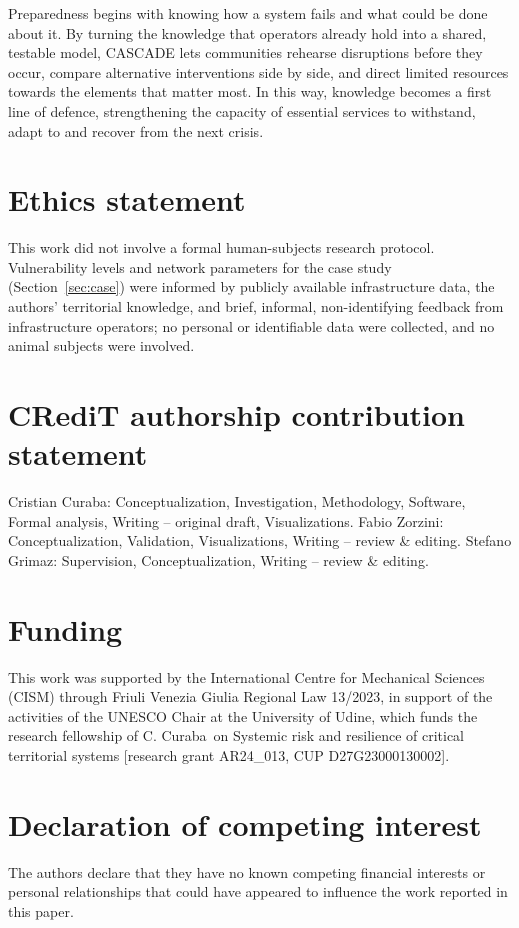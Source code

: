 \documentclass[review,12pt]{elsarticle}
\begin{document}
Preparedness begins with knowing how a system fails and what could be done about it. By turning the knowledge that operators already hold into a shared, testable model, CASCADE lets communities rehearse disruptions before they occur, compare alternative interventions side by side, and direct limited resources towards the elements that matter most. In this way, knowledge becomes a first line of defence, strengthening the capacity of essential services to withstand, adapt to and recover from the next crisis.

\section*{Ethics statement}
This work did not involve a formal human-subjects research protocol. Vulnerability levels and network parameters for the case study (Section~\ref{sec:case}) were informed by publicly available infrastructure data, the authors' territorial knowledge, and brief, informal, non-identifying feedback from infrastructure operators; no personal or identifiable data were collected, and no animal subjects were involved.

\section*{CRediT authorship contribution statement}
Cristian Curaba: Conceptualization, Investigation, Methodology, Software, Formal analysis, Writing – original draft, Visualizations.
Fabio Zorzini: Conceptualization, Validation, Visualizations, Writing – review \& editing.
Stefano Grimaz: Supervision, Conceptualization, Writing – review \& editing.

\section*{Funding}
This work was supported by the International Centre for Mechanical Sciences (CISM) through Friuli Venezia Giulia Regional Law 13/2023, in support of the activities of the UNESCO Chair at the University of Udine, which funds the research fellowship of C. Curaba on Systemic risk and resilience of critical territorial systems [research grant AR24\_013, CUP D27G23000130002].

\section*{Declaration of competing interest}
The authors declare that they have no known competing financial interests or personal relationships that could have appeared to influence the work reported in this paper.
\end{document}
